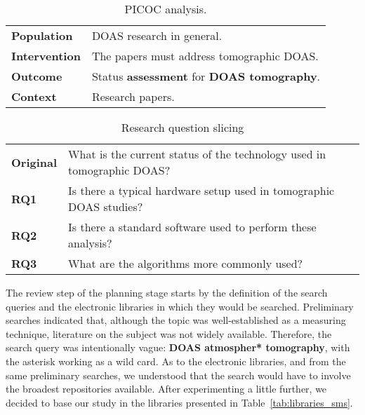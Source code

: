 \begin{table}[htb]
\small
\centering
\caption{PICOC analysis.}
\label{tab:picoc_sms}
\begin{tabular}{@{}ll@{}}
\toprule
\textbf{Population} & DOAS research in general.\\
\textbf{Intervention} & The papers must address tomographic DOAS.\\
\textbf{Outcome} & Status \textbf{assessment} for \textbf{DOAS tomography}.\\
\textbf{Context} & Research papers.\\\bottomrule
\end{tabular}
\end{table}

\begin{table}[htb]
\centering
\small
\caption{Research question slicing}
\label{tab:rq_slicing}
    \begin{tabularx}{\textwidth}{lX}
        \toprule
        \textbf{Original} & What is the current status of the technology used in
        tomographic DOAS? \\
        \textbf{RQ1} & Is there a typical hardware setup used in tomographic
        DOAS studies? \\
        \textbf{RQ2} & Is there a standard software used to perform these
        analysis? \\
        \textbf{RQ3} & What are the algorithms more commonly used?\\\bottomrule
    \end{tabularx}
\end{table}

The review step of the planning stage starts by the definition of the
search queries and the electronic libraries in which they would be
searched.  Preliminary searches indicated that, although the topic was
well-established as a measuring technique, literature on the subject was
not widely available. Therefore, the search query was intentionally
vague: \textbf{DOAS atmospher* tomography}, with the asterisk working as
a wild card. As to the electronic libraries, and from the same
preliminary searches, we understood that the search would have to
involve the broadest repositories available. After experimenting a
little further, we decided to base our study in the libraries presented
in Table~\ref{tab:libraries_sms}.

